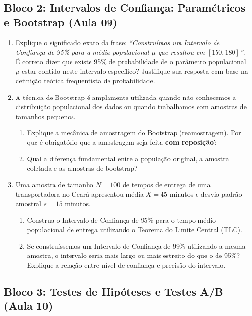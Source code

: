 \documentclass[12pt]{article}
\begin{document}
\subsection*{Bloco 2: Intervalos de Confiança: Paramétricos e Bootstrap (Aula 09)}

\begin{enumerate}[label=\textbf{Questão \arabic*}, resume]
    \item Explique o significado exato da frase: \textit{``Construímos um Intervalo de Confiança de 95\% para a média populacional $\mu$ que resultou em $[150, 180]$''}. \\
    É correto dizer que existe 95\% de probabilidade de o parâmetro populacional $\mu$ estar contido neste intervalo específico? Justifique sua resposta com base na definição teórica frequentista de probabilidade.

    \item A técnica de Bootstrap é amplamente utilizada quando não conhecemos a distribuição populacional dos dados ou quando trabalhamos com amostras de tamanhos pequenos.
    \begin{enumerate}[label=\alph*)]
        \item Explique a mecânica de amostragem do Bootstrap (reamostragem). Por que é obrigatório que a amostragem seja feita \textbf{com reposição}?
        \item Qual a diferença fundamental entre a população original, a amostra coletada e as amostras de bootstrap?
    \end{enumerate}

    \item Uma amostra de tamanho $N = 100$ de tempos de entrega de uma transportadora no Ceará apresentou média $\bar{X} = 45$ minutos e desvio padrão amostral $s = 15$ minutos.
    \begin{enumerate}[label=\alph*)]
        \item Construa o Intervalo de Confiança de 95\% para o tempo médio populacional de entrega utilizando o Teorema do Limite Central (TLC).
        \item Se construíssemos um Intervalo de Confiança de 99\% utilizando a mesma amostra, o intervalo seria mais largo ou mais estreito do que o de 95\%? Explique a relação entre nível de confiança e precisão do intervalo.
    \end{enumerate}
\end{enumerate}

\pagebreak

\subsection*{Bloco 3: Testes de Hipóteses e Testes A/B (Aula 10)}
\end{document}
